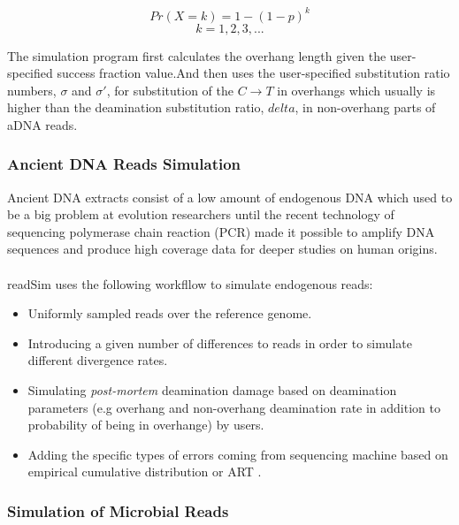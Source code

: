 \documentclass[11pt,a4paper]{report}
\begin{document}
$$Pr( X=k ) = 1 - (1 - p)^{k}$$
$$ k = 1, 2, 3, ... $$


The simulation program first calculates the overhang length given the user-specified 
success fraction value.And then uses the user-specified substitution ratio numbers,
 $ \sigma $ and $\sigma\prime $, for substitution of the $ C \rightarrow T $ in 
overhangs which usually is higher than the deamination substitution ratio, $delta$, 
in non-overhang parts of aDNA reads.




\subsubsection{Ancient DNA Reads Simulation }  
\label{ Ancient DNA Reads Simulation}

Ancient DNA extracts consist of a low amount of endogenous DNA which used to be 
a big problem at evolution researchers until the recent technology of sequencing 
polymerase chain reaction (PCR) \cite{PCR} made it possible to amplify DNA 
sequences and produce high coverage data for deeper studies on human origins.
\\\\
readSim uses the following workfllow to simulate endogenous reads:
\begin{itemize}
 \item Uniformly sampled reads over the reference genome.

 \item Introducing a given number of differences to 
 reads in order to simulate different divergence rates.

 \item Simulating \emph{post-mortem} deamination damage based on deamination 
parameters (e.g overhang and non-overhang deamination rate in addition to 
probability of being in overhange) by users. 

 \item Adding the specific types of errors coming from sequencing machine based
on empirical cumulative distribution or ART .
\end{itemize}





\subsubsection{Simulation of Microbial Reads } \label{Simulation of Microbial Reads }
\end{document}
